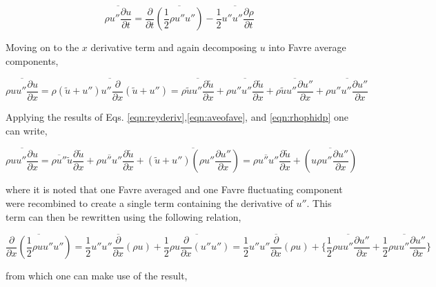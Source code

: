 \begin{equation}
	\overline{\rho u'' \frac{\partial u}{\partial t}} = \frac{\partial}{\partial t}\overline{
	(\frac{1}{2}\rho u'' u'')} - \overline{\frac{1}{2}u''u''\frac{\partial \rho}{\partial t}}	
\label{eqn:timeterm}
\end{equation}

	Moving on to the $x$ derivative term and again decomposing $u$ into Favre average components,

\begin{displaymath}
	\overline{\rho u u'' \frac{\partial u}{\partial x}} = \overline{\rho(\tilde u + u'')u''\frac{\partial}{\partial x}
	(\tilde u + u'')} = \overline{\rho \tilde u u'' \frac{\partial \tilde u}{\partial x}} + \overline{\rho u'' u''
	\frac{\partial \tilde u}{\partial x}} + \overline{\rho \tilde u u'' \frac{\partial u''}{\partial x}} +
	\overline{\rho u'' u'' \frac{\partial u''}{\partial x}}
\end{displaymath}

	Applying the results of Eqs. \ref{eqn:reyderiv},\ref{eqn:aveofave}, and \ref{eqn:rhophidp} one can write,

\begin{displaymath}
	\overline{\rho u u'' \frac{\partial u}{\partial x}} = \overline{\rho u''} \tilde u \frac{\partial \tilde u}{\partial x}
	+ \overline{\rho u'' u''}\frac{\partial \tilde u}{\partial x} + \overline{(\tilde u + u'')(\rho u'' 
	\frac{\partial u''}{\partial x})} = \overline{\rho u'' u''}\frac{\partial \tilde u}{\partial x} + \overline{(u \rho u'' 
	\frac{\partial u''}{\partial x})}
\end{displaymath}

	where it is noted that one Favre averaged and one Favre fluctuating component were recombined to create a single
term containing the derivative of $u''$.  This term can then be rewritten using the following relation,

\begin{displaymath}
	\overline{\frac{\partial}{\partial x}(\frac{1}{2}\rho u u'' u'')}= \overline{\frac{1}{2}u''u''\frac{\partial}
	{\partial x}(\rho u)} + \overline{\frac{1}{2}\rho u\frac{\partial}{\partial x}(u'' u'')} = \overline{\frac{1}{2}u''u''
	\frac{\partial}{\partial x}(\rho u)} + \Big\{ \overline{\frac{1}{2}\rho u u'' \frac{\partial u''}{\partial x}}
	+ \overline{\frac{1}{2}\rho u u'' \frac{\partial u''}{\partial x}}\Big\}
\end{displaymath}

	from which one can make use of the result,

